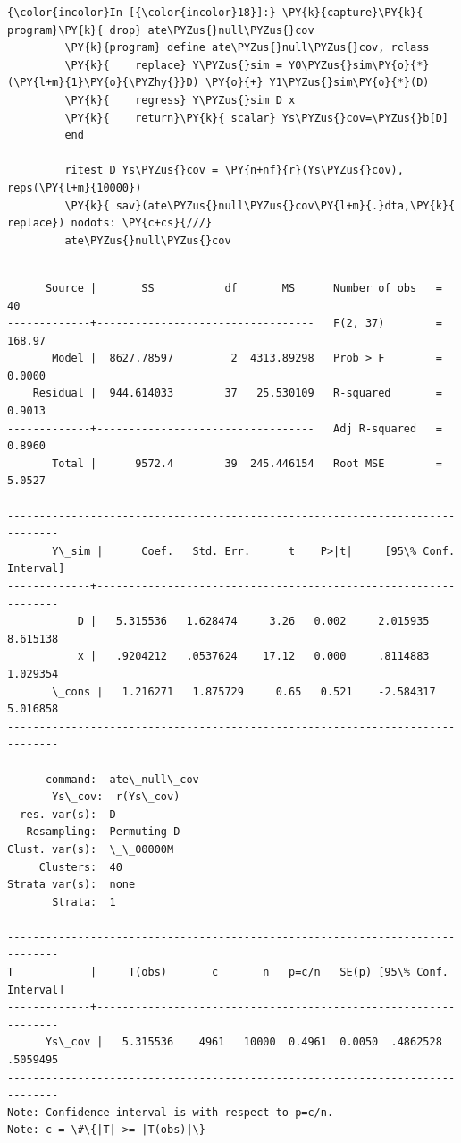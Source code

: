 \documentclass[11pt,notitlepage]{article}\usepackage[]{graphicx}\usepackage[]{color}
\makeatletter
\newenvironment{kframe}{%
 \def\at@end@of@kframe{}%
 \ifinner\ifhmode%
  \def\at@end@of@kframe{\end{minipage}}%
  \begin{minipage}{\columnwidth}%
 \fi\fi%
 \def\FrameCommand##1{\hskip\@totalleftmargin \hskip-\fboxsep
 \colorbox{shadecolor}{##1}\hskip-\fboxsep
     \hskip-\linewidth \hskip-\@totalleftmargin \hskip\columnwidth}%
 \MakeFramed {\advance\hsize-\width
   \@totalleftmargin\z@ \linewidth\hsize
   \@setminipage}}%
 {\par\unskip\endMakeFramed%
 \at@end@of@kframe}
\newenvironment{knitrout}{}{} %
\makeatother
\begin{document}
\begin{enumerate}[a)]
\begin{knitrout}
\begin{kframe}
    \begin{Verbatim}[commandchars=\\\{\}]
{\color{incolor}In [{\color{incolor}18}]:} \PY{k}{capture}\PY{k}{ program}\PY{k}{ drop} ate\PYZus{}null\PYZus{}cov
         \PY{k}{program} define ate\PYZus{}null\PYZus{}cov, rclass
         \PY{k}{	replace} Y\PYZus{}sim = Y0\PYZus{}sim\PY{o}{*}(\PY{l+m}{1}\PY{o}{\PYZhy{}}D) \PY{o}{+} Y1\PYZus{}sim\PY{o}{*}(D) 
         \PY{k}{	regress} Y\PYZus{}sim D x
         \PY{k}{    return}\PY{k}{ scalar} Ys\PYZus{}cov=\PYZus{}b[D]	
         end
         
         ritest D Ys\PYZus{}cov = \PY{n+nf}{r}(Ys\PYZus{}cov), reps(\PY{l+m}{10000})
         \PY{k}{ sav}(ate\PYZus{}null\PYZus{}cov\PY{l+m}{.}dta,\PY{k}{ replace}) nodots: \PY{c+cs}{///}
         ate\PYZus{}null\PYZus{}cov
\end{Verbatim}

    \begin{Verbatim}[commandchars=\\\{\}]

      Source |       SS           df       MS      Number of obs   =        40
-------------+----------------------------------   F(2, 37)        =    168.97
       Model |  8627.78597         2  4313.89298   Prob > F        =    0.0000
    Residual |  944.614033        37   25.530109   R-squared       =    0.9013
-------------+----------------------------------   Adj R-squared   =    0.8960
       Total |      9572.4        39  245.446154   Root MSE        =    5.0527

------------------------------------------------------------------------------
       Y\_sim |      Coef.   Std. Err.      t    P>|t|     [95\% Conf. Interval]
-------------+----------------------------------------------------------------
           D |   5.315536   1.628474     3.26   0.002     2.015935    8.615138
           x |   .9204212   .0537624    17.12   0.000     .8114883    1.029354
       \_cons |   1.216271   1.875729     0.65   0.521    -2.584317    5.016858
------------------------------------------------------------------------------

      command:  ate\_null\_cov
       Ys\_cov:  r(Ys\_cov)
  res. var(s):  D
   Resampling:  Permuting D
Clust. var(s):  \_\_00000M
     Clusters:  40
Strata var(s):  none
       Strata:  1

------------------------------------------------------------------------------
T            |     T(obs)       c       n   p=c/n   SE(p) [95\% Conf. Interval]
-------------+----------------------------------------------------------------
      Ys\_cov |   5.315536    4961   10000  0.4961  0.0050  .4862528   .5059495
------------------------------------------------------------------------------
Note: Confidence interval is with respect to p=c/n.
Note: c = \#\{|T| >= |T(obs)|\}


\end{Verbatim}
\end{kframe}
\end{knitrout}
\end{enumerate}
\end{document}
